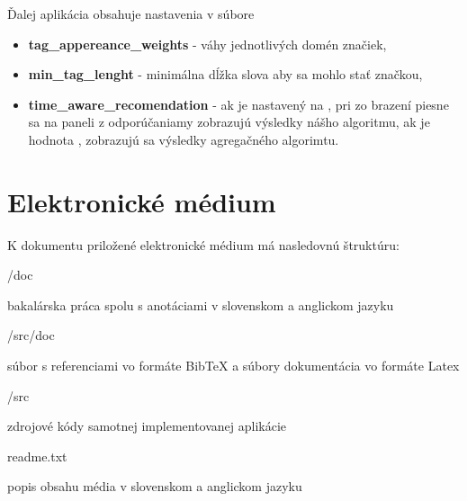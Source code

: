 Ďalej aplikácia obsahuje nastavenia v súbore 

\begin{itemize}
\item{\textbf{tag\_appereance\_weights} - váhy jednotlivých domén značiek,}
\item{\textbf{min\_tag\_lenght} - minimálna dĺžka slova aby sa mohlo stať značkou,}
\item{\textbf{time\_aware\_recomendation} - ak je nastavený na , pri zo brazení
    piesne sa na paneli z odporúčaniamy zobrazujú výsledky nášho algoritmu, ak
    je hodnota , zobrazujú sa výsledky agregačného algorimtu.}
\end{itemize}

\section{Elektronické médium}

K dokumentu priložené elektronické médium má nasledovnú štruktúru:
\begin{my_itemize}

\emptyitem /doc
    \begin{my_itemize}
    \myitem bakalárska práca spolu s anotáciami v slovenskom a anglickom jazyku
    \end{my_itemize}

\emptyitem /src/doc
    \begin{my_itemize}
    \myitem súbor s referenciami vo formáte BibTeX a súbory dokumentácia vo formáte Latex
    \end{my_itemize}

\emptyitem /src
    \begin{my_itemize}
    \myitem zdrojové kódy samotnej implementovanej aplikácie
    \end{my_itemize}

\emptyitem readme.txt
    \begin{my_itemize}
    \myitem popis obsahu média v slovenskom a anglickom jazyku
    \end{my_itemize}
\end{my_itemize}
